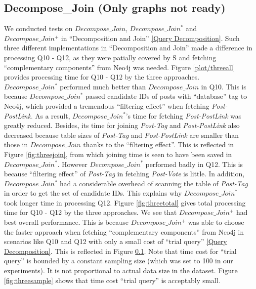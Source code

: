 \subsection{Decompose\_Join (Only graphs not ready)}
We conducted tests on $Decompose\_Join$, $Decompose\_Join^{*}$ and $Decompose\_Join^{+}$ in ``Decomposition and Join'' \ref{Query Decomposition}. Such three different implementations in ``Decomposition and Join'' made a difference in processing Q10 - Q12, as they were patially covered by S and fetching ``complementary components'' from Neo4j was needed. Figure \ref{plot/threeall} provides processing time for Q10 - Q12 by the three approaches. $Decompose\_Join^{*}$ performed much better than $Decompose\_Join$ in Q10. This is because $Decompose\_Join^{*}$ passed candidate IDs of posts with ``database'' tag to Neo4j, which provided a tremendous ``filtering effect'' when fetching \textit{Post-PostLink}. As a result, $Decompose\_Join^{*}$'s time for fetching \textit{Post-PostLink} was greatly reduced. Besides, its time for joining \textit{Post-Tag} and \textit{Post-PostLink} also decreased because table sizes of \textit{Post-Tag} and \textit{Post-PostLink} are smaller than those in $Decompose\_Join$ thanks to the ``filtering effect''. This is reflected in Figure \ref{fig:threejoin}, from which joining time is seen to have been saved in $Decompose\_Join^{*}$. However $Decompose\_Join^{*}$ performed badly in Q12. This is because ``filtering effect'' of \textit{Post-Tag} in fetching \textit{Post-Vote} is little. In addition, $Decompose\_Join^{*}$ had a considerable overhead of scanning the table of \textit{Post-Tag} in order to get the set of candidate IDs. This explains why $Decompose\_Join^{*}$ took longer time in processing Q12. Figure \ref{fig:threetotal} gives total processing time for Q10 - Q12 by the three approaches. We see that $Decompose\_Join^{+}$ had best overall performance. This is because $Decompose\_Join^{+}$ was able to choose the faster approach when fetching ``complementary components'' from Neo4j in scenarios like Q10 and Q12 with only a small cost of ``trial query'' \ref{Query Decomposition}. This is reflected in Figure \ref{}. Note that time cost for ``trial query'' is bounded by a constant sampling size (which was set to 100 in our experiments). It is not proportional to actual data size in the dataset. Figure \ref{fig:threesample} shows that time cost ``trial query'' is acceptably small. 


